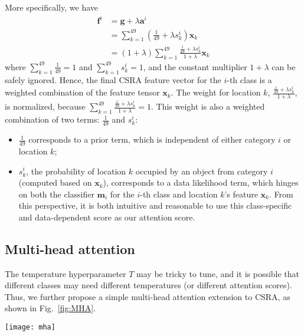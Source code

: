 \documentclass[10pt,twocolumn,letterpaper]{article}
\begin{document}
More specifically, we have
\begin{align} 
	\label{eq:fi_re}
	\mathbf{f}^i & = \mathbf{g} + \lambda \mathbf{a}^i                                                      \\
		         & =  \sum_{k=1}^{49} (\frac{1}{49} + \lambda s_k^i) \mathbf{x}_k                           \\
				 & = (1+\lambda)\sum_{k=1}^{49} \frac{\frac{1}{49} + \lambda s_k^i}{1+\lambda} \mathbf{x}_k
\end{align}
where $\sum_{k=1}^{49}\frac{1}{49}=1$ and $\sum_{k=1}^{49}s_k^i=1$, and the constant multiplier $1+\lambda$ can be safely ignored. Hence, the final CSRA feature vector for the $i$-th class is a weighted combination of the feature tensor $\mathbf{x}_k$. The weight for location $k$, $\frac{\frac{1}{49} + \lambda s_k^i}{1+\lambda}$, is normalized, because $\sum_{k=1}^{49} \frac{\frac{1}{49} + \lambda s_k^i}{1+\lambda} = 1$. This weight is also a weighted combination of two terms: $\frac{1}{49}$ and $s_k^i$:
\begin{itemize}
	\item $\frac{1}{49}$ corresponds to a prior term, which is independent of either category $i$ or location $k$;
	\item $s_k^i$, the probability of location $k$ occupied by an object from category $i$ (computed based on $\mathbf{x}_k$), corresponds to a data likelihood term, which hinges on both the classifier $\mathbf{m}_i$ for the $i$-th class and location $k$'s feature $\mathbf{x}_k$. From this perspective, it is both intuitive and reasonable to use this class-specific and data-dependent score as our attention score.
\end{itemize}

\subsection{Multi-head attention}\label{sec:MHA}

The temperature hyperparameter $T$ may be tricky to tune, and it is possible that different classes may need different temperatures (or different attention scores). Thus, we further propose a simple multi-head attention extension to CSRA, as shown in Fig.~\ref{fig:MHA}.

\begin{figure*}
	\centering
	\texttt{[image: mha]}
	\caption{Overall pipeline of multi-head CSRA. An Image is first sent to a CNN backbone to get the feature tensor $\mathbf{x}$, which is used to generate multiple score tensors ($\in \mathbb{R}^{C\times h\times w}$, $C$ is the number of classes) by different $1 \times 1$ convolutions (FCs). The residual attention defined in Eq.~(\ref{eq:yi_softmax}) is applied to every score tensor to produce different logits $\hat{\mathbf{y}}_{T_i}$ ($i\in\{1,2,\dots,H\}$, $\hat{\mathbf{y}}_{T_i}\in \mathbb{R}^C$), which are then fused to get the final logits $\hat{\mathbf{y}}_o$. The temperature $T$ is different in different branches, but the same $\lambda$ is shared among them.}
	\label{fig:MHA}
\end{figure*}
\end{document}
